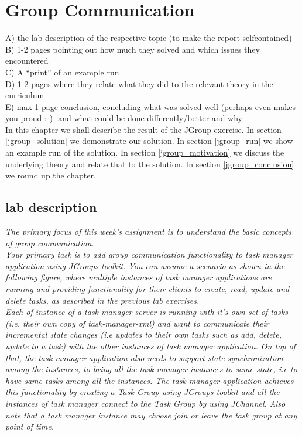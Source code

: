 \chapter{Group Communication}
\minitoc

A) the lab description of the respective topic (to make the report selfcontained)\\
B) 1-2 pages pointing out how much they solved and which issues they encountered\\
C) A “print” of an example run\\
D) 1-2 pages where they relate what they did to the relevant theory in the curriculum\\
E) max 1 page conclusion, concluding what was solved well (perhaps even makes you proud :-)- and what could be done differently/better and why\\


In this chapter we shall describe the result of the JGroup exercise. In section \ref{jgroup_solution} we demonstrate our solution. In section \ref{jgroup_run} we show an example run of the solution. In section \ref{jgroup_motivation} we discuss the underlying theory and relate that to the solution. In section \ref{jgroup_conclusion} we round up the chapter.


\section{lab description}

\textit{The primary focus of this week’s assignment is to understand the basic concepts of group communication.} \\

\textit{Your primary task is to add group communication functionality to task manager application using JGroups toolkit. You can assume a scenario as shown in the following figure, where multiple instances of task manager applications are running and providing functionality for their clients to create, read, update and delete tasks, as described in the previous lab exercises.}\\

\textit{Each of instance of a task manager server is running with it’s own set of tasks (i.e. their own copy of task-manager-xml) and want to communicate their incremental state changes (i.e updates to their own tasks such as add, delete, update to a task) with the other instances of task manager application.  On top of that, the task manager application also needs to support state synchronization among the instances, to bring all the task manager instances to same state, i.e to have same tasks among all the instances. The task manager application  achieves this functionality by creating a Task Group using JGroups toolkit and all the instances of task manager connect to the Task Group by using JChannel. Also note that a task manager instance may choose join or leave the task group at any point of time.}\\

